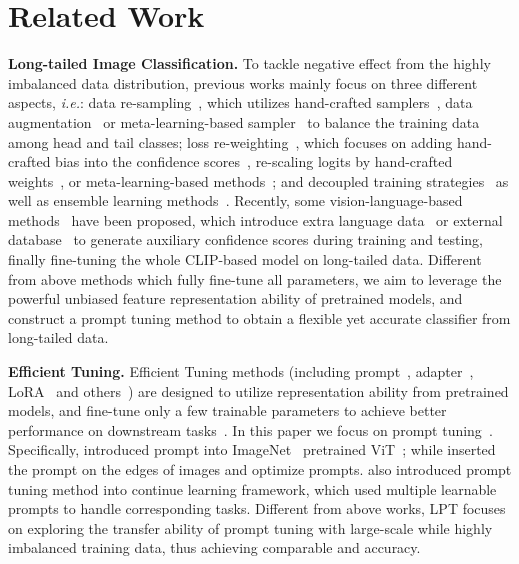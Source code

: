 \documentclass{article} \usepackage{iclr2023_conference,times}
\newcommand{\ie}{\emph{i.e.}}
\begin{document}
\section{Related Work}\label{sec:related}
\vspace{-0.6em}
\textbf{Long-tailed Image Classification. }To tackle negative effect from the highly imbalanced data distribution, previous works mainly focus on three different aspects, \ie: 
data re-sampling~\citep{Kang2020Decoupling,li2021metasaug,ren2020metasoftmax}, which utilizes hand-crafted samplers~\citep{Kang2020Decoupling}, data augmentation~\citep{li2021metasaug} or meta-learning-based sampler~\citep{ren2020metasoftmax} to balance the training data among head and tail classes; 
loss re-weighting~\citep{cui2019cbloss,menon2021longtail,Li2022Long,Jamal_2020_CVPR,tan2020equalization}, which focuses on adding hand-crafted bias into the confidence scores~\citep{menon2021longtail,Li2022Long}, re-scaling logits by hand-crafted weights~\citep{cui2019cbloss,tan2020equalization}, or meta-learning-based methods~\citep{Jamal_2020_CVPR}; 
and decoupled training strategies~\citep{Kang2020Decoupling,li2021self} as well as ensemble learning methods~\citep{zhou2020bbn,wang2020long}. Recently, some vision-language-based methods~\citep{ma2021simple,tian2021vl,Long2022} have been proposed, which introduce extra language data~\citep{ma2021simple,tian2021vl} or external database~\citep{Long2022} to generate auxiliary confidence scores during training and testing, finally fine-tuning the whole CLIP-based model on long-tailed data. 
Different from above methods which fully fine-tune all parameters,
we aim to leverage the powerful unbiased feature representation ability of pretrained models, and construct a prompt tuning method to obtain a flexible yet accurate classifier from long-tailed data.

\textbf{Efficient Tuning. }Efficient Tuning methods (including prompt~\citep{lester2021power,jia2022vpt}, adapter~\citep{pmlr-v97-houlsby19a,he2022towards,nie2022protuning,chen2022convadapter}, LoRA~\citep{hu2022lora} and others~\citep{frankle2021training,touvron2022things}) are designed to utilize representation ability from pretrained models, and fine-tune only a few trainable parameters to achieve better performance on downstream tasks~\citep{zhai2019largescale,lin2014microsoft,zhou2017scene}. 
In this paper we focus on prompt tuning~\citep{zhou2022learning,jia2022vpt,bahng2022exploring}. Specifically, \citet{jia2022vpt} introduced prompt into ImageNet~\citep{deng2009imagenet} pretrained ViT~\citep{dosovitskiy2021an};
while \citet{bahng2022exploring} inserted the prompt on the edges of images and optimize prompts. \citet{wang2022learning} also introduced prompt tuning method into continue learning framework, which used multiple learnable prompts to handle corresponding tasks. 
Different from above works, LPT focuses on exploring the transfer ability of prompt tuning with large-scale while highly imbalanced training data, thus achieving comparable and accuracy. 
\end{document}
